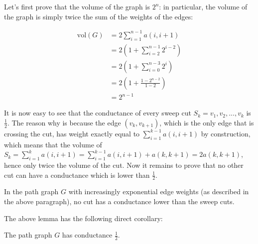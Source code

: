 \documentclass[../main.tex]{subfiles}
\begin{document}
Let's first prove that the volume of the graph is $2^n$: in particular, the volume of the graph is simply twice the sum of the weights of the edges:

\begin{align}
    \text{vol}(G) &= 2 \sum_{i=1}^{n-1} a(i, i+1) \\
    & = 2 \left(1 + \sum_{i=2}^{n-1} 2^{i-2}\right) \\
    & = 2 \left(1 + \sum_{i=0}^{n-3} 2^i \right) \\ 
    & = 2 \left(1 + \frac{1 - 2^{n-2}}{1 - 2} \right) \\
    & = 2^{n-1}
\end{align}

It is now easy to see that the conductance of every sweep cut $S_k = {v_1, v_2, ..., v_k}$ is $\frac{1}{2}$. The reason why is because the edge $(v_k, v_{k+1})$, which is the only edge that is crossing the cut, has weight exactly equal to $\sum_{i=1}^{k-1} a(i, i+1)$ by construction, which means that the volume of $S_k = \sum_{i=1}^{k} a(i, i+1) = \sum_{i=1}^{k-1} a(i, i+1) + a(k, k+1) = 2 a(k, k+1)$, hence only twice the volume of the cut. Now it remains to prove that no other cut can have a conductance which is lower than $\frac{1}{2}$.

\begin{lemma}
    In the path graph $G$ with increasingly exponential edge weights (as described in the above paragraph), no cut has a conductance lower than the sweep cuts.
\end{lemma}

The above lemma has the following direct corollary:

\begin{corollary}
    The path graph $G$ has conductance $\frac{1}{2}$.
\end{corollary}
\end{document}
